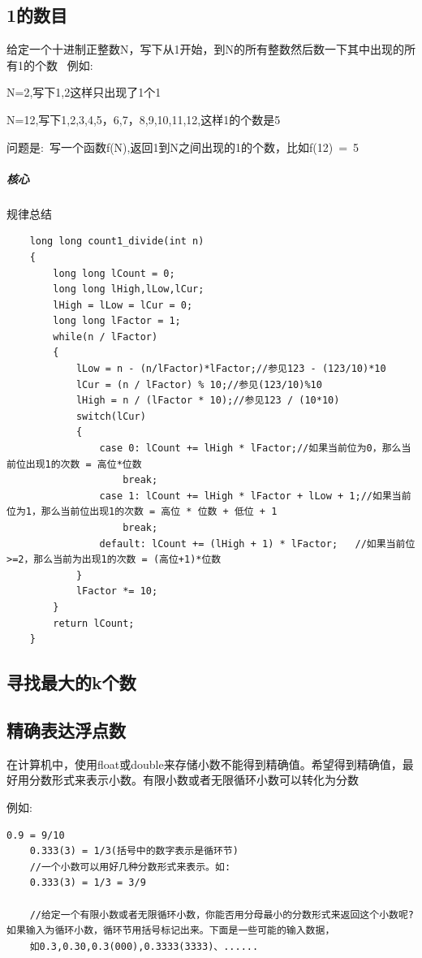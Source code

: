 \documentclass[UTF8,a4paper,12pt]{ctexbook}
\begin{document}
		\subsection{1的数目 }
			给定一个十进制正整数N，写下从1开始，到N的所有整数然后数一下其中出现的所有1的个数 
			例如: 
			
			N=2,写下1,2这样只出现了1个1 
			
			N=12,写下1,2,3,4,5，6,7，8,9,10,11,12,这样1的个数是5 
			
			问题是: 写一个函数f(N),返回1到N之间出现的1的个数，比如f(12) = 5
			
			\subparagraph{核心} 规律总结
			
			\begin{lstlisting}
	long long count1_divide(int n)  
	{  
		long long lCount = 0;  
		long long lHigh,lLow,lCur;  
		lHigh = lLow = lCur = 0;  
		long long lFactor = 1;  
		while(n / lFactor)  
		{  
			lLow = n - (n/lFactor)*lFactor;//参见123 - (123/10)*10  
			lCur = (n / lFactor) % 10;//参见(123/10)%10  
			lHigh = n / (lFactor * 10);//参见123 / (10*10)  
			switch(lCur)  
			{  
				case 0: lCount += lHigh * lFactor;//如果当前位为0，那么当前位出现1的次数 = 高位*位数  
					break;  
				case 1: lCount += lHigh * lFactor + lLow + 1;//如果当前位为1，那么当前位出现1的次数 = 高位 * 位数 + 低位 + 1  
					break;  
				default: lCount += (lHigh + 1) * lFactor;	//如果当前位>=2，那么当前为出现1的次数 = (高位+1)*位数  
			}  
			lFactor *= 10;  
		}  
		return lCount;  
	}  
			\end{lstlisting}
		\subsection{寻找最大的k个数 }
		
		\subsection{精确表达浮点数 }
			在计算机中，使用float或double来存储小数不能得到精确值。希望得到精确值，最好用分数形式来表示小数。有限小数或者无限循环小数可以转化为分数 
			
			例如: 
			\begin{lstlisting}[frame=L]
	0.9 = 9/10 
	0.333(3) = 1/3(括号中的数字表示是循环节) 
	//一个小数可以用好几种分数形式来表示。如: 
	0.333(3) = 1/3 = 3/9 
	
	//给定一个有限小数或者无限循环小数，你能否用分母最小的分数形式来返回这个小数呢?如果输入为循环小数，循环节用括号标记出来。下面是一些可能的输入数据， 
	如0.3,0.30,0.3(000),0.3333(3333)、...... 			
			\end{lstlisting}
			
\end{document}
